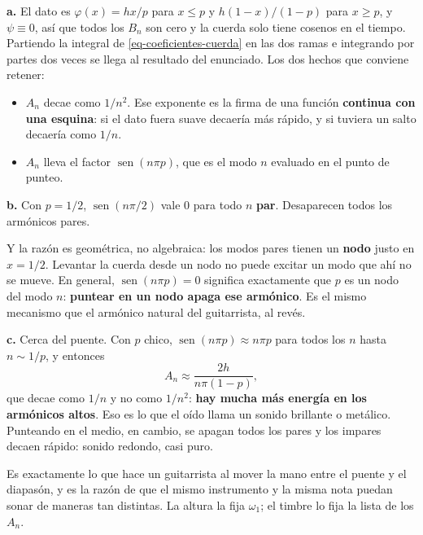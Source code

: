 \documentclass[
  spanish,
  a4paper,
]{scrbook}
\providecommand{\tightlist}{%
  \setlength{\itemsep}{0pt}\setlength{\parskip}{0pt}}
\theoremstyle{definition}
\theoremstyle{plain}
\theoremstyle{definition}
\theoremstyle{plain}
\theoremstyle{definition}
\theoremstyle{remark}
\begin{document}
\begin{tcolorbox}[enhanced jigsaw, arc=.35mm, bottomrule=.15mm, bottomtitle=1mm, breakable, colback=white, colbacktitle=quarto-callout-tip-color!10!white, colframe=quarto-callout-tip-color-frame, coltitle=black, left=2mm, leftrule=.75mm, opacityback=0, opacitybacktitle=0.6, rightrule=.15mm, title=\textcolor{quarto-callout-tip-color}{\faLightbulb}\hspace{0.5em}{Solución}, titlerule=0mm, toprule=.15mm, toptitle=1mm]

\textbf{a.} El dato es \(\varphi(x) = hx/p\) para \(x\le p\) y
\(h(1-x)/(1-p)\) para \(x\ge p\), y \(\psi \equiv 0\), así que todos los
\(B_n\) son cero y la cuerda solo tiene cosenos en el tiempo. Partiendo
la integral de \ref{eq-coeficientes-cuerda} en las dos ramas e
integrando por partes dos veces se llega al resultado del enunciado. Los
dos hechos que conviene retener:

\begin{itemize}
\tightlist
\item
  \(A_n\) decae como \(1/n^2\). Ese exponente es la firma de una función
  \textbf{continua con una esquina}: si el dato fuera suave decaería más
  rápido, y si tuviera un salto decaería como \(1/n\).
\item
  \(A_n\) lleva el factor \(\operatorname{sen}(n\pi p)\), que es el modo
  \(n\) evaluado en el punto de punteo.
\end{itemize}

\textbf{b.} Con \(p=1/2\), \(\operatorname{sen}(n\pi/2)\) vale \(0\)
para todo \(n\) \textbf{par}. Desaparecen todos los armónicos pares.

Y la razón es geométrica, no algebraica: los modos pares tienen un
\textbf{nodo} justo en \(x=1/2\). Levantar la cuerda desde un nodo no
puede excitar un modo que ahí no se mueve. En general,
\(\operatorname{sen}(n\pi p) = 0\) significa exactamente que \(p\) es un
nodo del modo \(n\): \textbf{puntear en un nodo apaga ese armónico}. Es
el mismo mecanismo que el armónico natural del guitarrista, al revés.

\textbf{c.} Cerca del puente. Con \(p\) chico,
\(\operatorname{sen}(n\pi p) \approx n\pi p\) para todos los \(n\) hasta
\(n \sim 1/p\), y entonces \[A_n \approx \frac{2h}{n\pi(1-p)} ,\] que
decae como \(1/n\) y no como \(1/n^2\): \textbf{hay mucha más energía en
los armónicos altos}. Eso es lo que el oído llama un sonido brillante o
metálico. Punteando en el medio, en cambio, se apagan todos los pares y
los impares decaen rápido: sonido redondo, casi puro.

Es exactamente lo que hace un guitarrista al mover la mano entre el
puente y el diapasón, y es la razón de que el mismo instrumento y la
misma nota puedan sonar de maneras tan distintas. La altura la fija
\(\omega_1\); el timbre lo fija la lista de los \(A_n\).

\end{tcolorbox}
\end{document}
